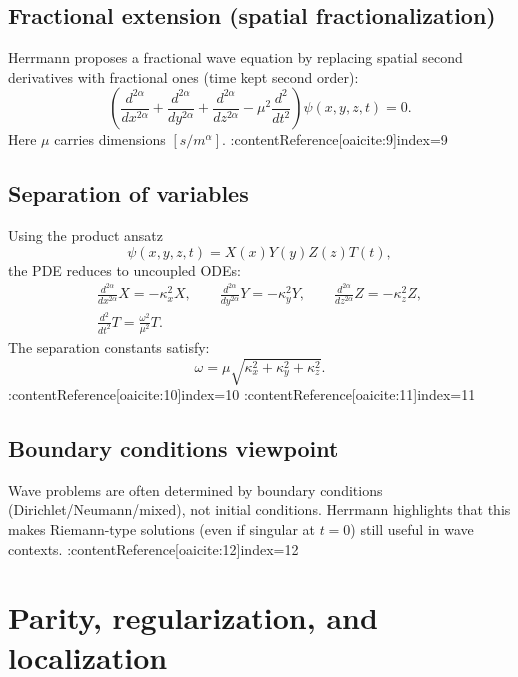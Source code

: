\subsection{Fractional extension (spatial fractionalization)}
Herrmann proposes a fractional wave equation by replacing spatial second derivatives
with fractional ones (time kept second order):
\begin{equation}
\boxed{
\left(
\frac{d^{2\alpha}}{dx^{2\alpha}}
+
\frac{d^{2\alpha}}{dy^{2\alpha}}
+
\frac{d^{2\alpha}}{dz^{2\alpha}}
-\mu^2\frac{d^2}{dt^2}
\right)\psi(x,y,z,t)=0.
}
\end{equation}
Here $\mu$ carries dimensions $[s/m^\alpha]$. :contentReference[oaicite:9]{index=9}

\subsection{Separation of variables}
Using the product ansatz
\begin{equation}
\psi(x,y,z,t)=X(x)Y(y)Z(z)T(t),
\end{equation}
the PDE reduces to uncoupled ODEs:
\begin{align}
\boxed{
\frac{d^{2\alpha}}{dx^{2\alpha}}X = -\kappa_x^2 X,
\qquad
\frac{d^{2\alpha}}{dy^{2\alpha}}Y = -\kappa_y^2 Y,
\qquad
\frac{d^{2\alpha}}{dz^{2\alpha}}Z = -\kappa_z^2 Z,
}
\\[4pt]
\boxed{
\frac{d^2}{dt^2}T = \frac{\omega^2}{\mu^2}T.
}
\end{align}
The separation constants satisfy:
\begin{equation}
\boxed{
\omega=\mu\sqrt{\kappa_x^2+\kappa_y^2+\kappa_z^2}.
}
\end{equation}
:contentReference[oaicite:10]{index=10} :contentReference[oaicite:11]{index=11}

\subsection{Boundary conditions viewpoint}
Wave problems are often determined by boundary conditions (Dirichlet/Neumann/mixed),
not initial conditions.
Herrmann highlights that this makes Riemann-type solutions (even if singular at $t=0$)
still useful in wave contexts. :contentReference[oaicite:12]{index=12}


\section{Parity, regularization, and localization}

